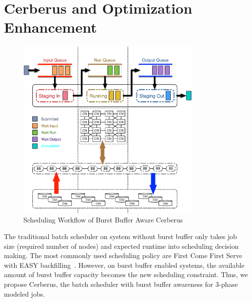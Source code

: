 \section{Cerberus and Optimization Enhancement}
\label{Sec:Scheduler}

\begin{figure}[!htbp]
        \centering
        \includegraphics[width=3.6in]{CerberusBBSystem}
        \caption{Scheduling Workflow of Burst Buffer Aware Cerberus}
        \label{Fig:CerberusQueues}
\end{figure}

The traditional batch scheduler on system without burst buffer only
takes job size (required number of nodes) and expected runtime into scheduling decision making. 
The most commonly used scheduling policy are First Come First Serve with EASY backfilling~\cite{tsafrir-tpds-2007}.
However, on burst buffer enabled systems, 
the available amount of burst buffer capacity becomes the new scheduling constraint. 
Thus, we propose Cerberus, 
the batch scheduler with burst buffer awareness for 3-phase modeled jobs. 

